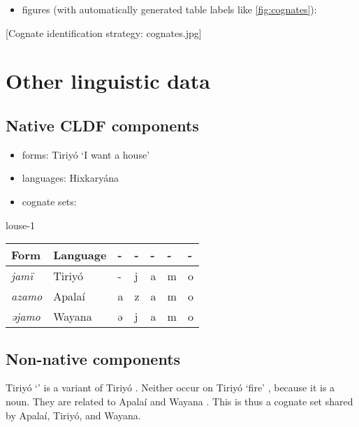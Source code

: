 \documentclass{article}
\begin{document}
\begin{itemize}
\tightlist
\item
  figures (with automatically generated table labels like
  \cref{fig:cognates}):
\end{itemize}

{[}Cognate identification strategy: cognates.jpg{]}

\section{\texorpdfstring{Other linguistic data
\label{sec:data}}{Other linguistic data }}

\subsection{Native CLDF components}

\begin{itemize}
\tightlist
\item
  forms: Tiriyó  `I want a house'
  \parencites[417]{triomeira1999}
\item
  languages: Hixkaryána
\item
  cognate sets:
\end{itemize}

louse-1

\begin{longtable}[]{@{}lllllll@{}}
\toprule()
Form & Language & - & - & - & - & - \\
\midrule()
\endhead
\emph{jamï} & Tiriyó & - & j & a & m & o \\
\emph{azamo} & Apalaí & a & z & a & m & o \\
\emph{əjamo} & Wayana & ə & j & a & m & o \\
\bottomrule()
\end{longtable}

\subsection{Non-native components}

Tiriyó  `' \parencites[327]{triomeira1999} is a variant
of Tiriyó  \parencites[327]{triomeira1999}. Neither occur on
Tiriyó  `fire' \parencites[314]{triomeira1999}, because it is
a noun. They are related to Apalaí 
\parencites[77]{koehn1986apalai} and Wayana 
\parencites[236]{wayanatavares2005}. This is thus a cognate set shared
by Apalaí, Tiriyó, and Wayana.
\end{document}
